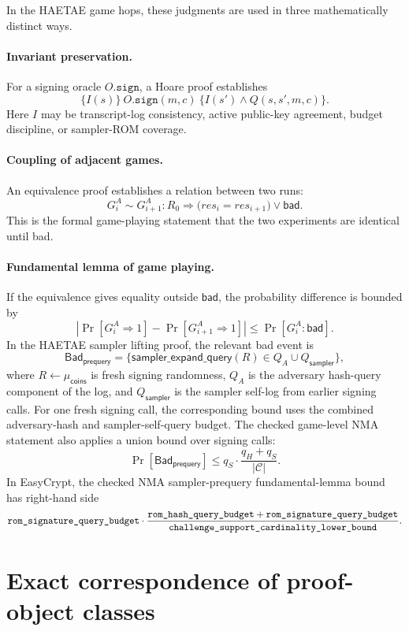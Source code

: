In the HAETAE game hops, these judgments are used in three mathematically
distinct ways.

\paragraph{Invariant preservation.}
For a signing oracle \(O.\mathtt{sign}\), a Hoare proof establishes
\[
  \{I(s)\}\ O.\mathtt{sign}(m,c)\ \{I(s')\wedge Q(s,s',m,c)\}.
\]
Here \(I\) may be transcript-log consistency, active public-key agreement,
budget discipline, or sampler-ROM coverage.

\paragraph{Coupling of adjacent games.}
An equivalence proof establishes a relation between two runs:
\[
  G_i^A \sim G_{i+1}^A :
  R_0 \Rightarrow
  \bigl(res_i=res_{i+1}\bigr)\vee\mathsf{bad}.
\]
This is the formal game-playing statement that the two experiments are identical
until bad.

\paragraph{Fundamental lemma of game playing.}
If the equivalence gives equality outside \(\mathsf{bad}\), the probability
difference is bounded by
\[
  \left|
  \Pr[G_i^A\Rightarrow 1]
  -
  \Pr[G_{i+1}^A\Rightarrow 1]
  \right|
  \le
  \Pr[G_i^A:\mathsf{bad}].
\]
In the HAETAE sampler lifting proof, the relevant bad event is
\[
  \mathsf{Bad}_{\mathsf{prequery}}
  =
  \{\mathsf{sampler\_expand\_query}(R)
    \in Q_A\cup Q_{\mathsf{sampler}}\},
\]
where \(R\leftarrow\mu_{\mathsf{coins}}\) is fresh signing randomness,
\(Q_A\) is the adversary hash-query component of the log, and
\(Q_{\mathsf{sampler}}\) is the sampler self-log from earlier signing calls.
For one fresh signing call, the corresponding bound uses the combined
adversary-hash and sampler-self-query budget.  The checked game-level NMA
statement also applies a union bound over signing calls:
\[
  \Pr[\mathsf{Bad}_{\mathsf{prequery}}]
  \le
  q_S\cdot\frac{q_H+q_S}{|\mathcal C|}.
\]
In EasyCrypt, the checked NMA sampler-prequery fundamental-lemma bound has
right-hand side
\[
  \texttt{rom\_signature\_query\_budget}
  \cdot
  \frac{
    \texttt{rom\_hash\_query\_budget}
    +
    \texttt{rom\_signature\_query\_budget}}
  {\texttt{challenge\_support\_cardinality\_lower\_bound}} .
\]

\section{Exact correspondence of proof-object classes}
\label{app:proof-object-exact-correspondence}

